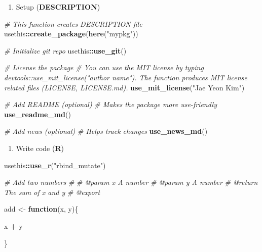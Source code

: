 \documentclass[
]{book}
\newenvironment{Shaded}{\begin{snugshade}}{\end{snugshade}}
\newcommand{\CommentTok}[1]{\textcolor[rgb]{0.56,0.35,0.01}{\textit{#1}}}
\newcommand{\ControlFlowTok}[1]{\textcolor[rgb]{0.13,0.29,0.53}{\textbf{#1}}}
\newcommand{\KeywordTok}[1]{\textcolor[rgb]{0.13,0.29,0.53}{\textbf{#1}}}
\newcommand{\NormalTok}[1]{#1}
\newcommand{\OperatorTok}[1]{\textcolor[rgb]{0.81,0.36,0.00}{\textbf{#1}}}
\newcommand{\StringTok}[1]{\textcolor[rgb]{0.31,0.60,0.02}{#1}}
\providecommand{\tightlist}{%
  \setlength{\itemsep}{0pt}\setlength{\parskip}{0pt}}
\begin{document}
\begin{enumerate}
\def\labelenumi{\arabic{enumi}.}
\tightlist
\item
  Setup (\textbf{DESCRIPTION})
\end{enumerate}

\begin{Shaded}
\begin{Highlighting}[]
\CommentTok{\# This function creates DESCRIPTION file }
\NormalTok{usethis}\OperatorTok{::}\KeywordTok{create\_package}\NormalTok{(}\KeywordTok{here}\NormalTok{(}\StringTok{"mypkg"}\NormalTok{))}

\CommentTok{\# Initialize git repo }
\NormalTok{usethis}\OperatorTok{::}\KeywordTok{use\_git}\NormalTok{()}

\CommentTok{\# License the package }
\CommentTok{\# You can use the MIT license by typing devtools::use\_mit\_license("author name"). The function produces MIT license related files (LICENSE, LICENSE.md).}
\KeywordTok{use\_mit\_license}\NormalTok{(}\StringTok{"Jae Yeon Kim"}\NormalTok{)}

\CommentTok{\# Add README (optional)}
\CommentTok{\# Makes the package more use{-}friendly }
\KeywordTok{use\_readme\_md}\NormalTok{()}

\CommentTok{\# Add news (optional) }
\CommentTok{\# Helps track changes }
\KeywordTok{use\_news\_md}\NormalTok{() }
\end{Highlighting}
\end{Shaded}

\begin{enumerate}
\def\labelenumi{\arabic{enumi}.}
\setcounter{enumi}{1}
\tightlist
\item
  Write code (\textbf{R})
\end{enumerate}

\begin{Shaded}
\begin{Highlighting}[]
\NormalTok{usethis}\OperatorTok{::}\KeywordTok{use\_r}\NormalTok{(}\StringTok{"rbind\_mutate"}\NormalTok{)}
\end{Highlighting}
\end{Shaded}

\begin{Shaded}
\begin{Highlighting}[]
\CommentTok{\#\textquotesingle{} Add two numbers}
\CommentTok{\#\textquotesingle{}}
\CommentTok{\#\textquotesingle{} @param x A number}
\CommentTok{\#\textquotesingle{} @param y A number}
\CommentTok{\#\textquotesingle{} @return The sum of x and y }
\CommentTok{\#\textquotesingle{} @export}

\NormalTok{add \textless{}{-}}\StringTok{ }\ControlFlowTok{function}\NormalTok{(x, y)\{}
  
\NormalTok{  x }\OperatorTok{+}\StringTok{ }\NormalTok{y}
  
\NormalTok{\}}
\end{Highlighting}
\end{Shaded}
\end{document}
